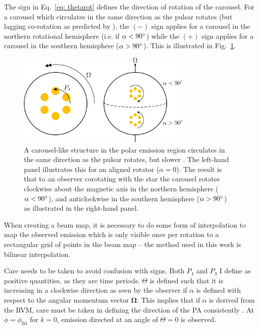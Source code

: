 The sign in Eq.~\eqref{eq: thetarot} defines the direction of rotation of the carousel. For a carousel which circulates in the same direction as the pulsar rotates (but lagging co-rotation as predicted by \citealt{RSxx1975}), the $(-)$ sign applies for a carousel in the northern rotational hemisphere (i.e. if $\alpha < 90^\circ$) while the $(+)$ sign applies for a carousel in the southern hemisphere ($\alpha > 90^\circ$). This is illustrated in Fig.~\ref{fig: geometry derivations - carousel direction}.
\begin{figure}
    \begin{center}
        \includegraphics[width=0.75\textwidth]{Figures/geometry_appendix/carousel_direction}
        \caption[Circulation direction of the carousel]{A carousel-like structure in the polar emission region circulates in the same direction as the pulsar rotates, but slower \citep{RSxx1975}. The left-hand panel illustrates this for an aligned rotator ($\alpha = 0$). The result is that to an observer corotating with the star the carousel rotates clockwise about the magnetic axis in the northern hemisphere ($\alpha < 90^\circ$), and anticlockwise in the southern hemisphere ($\alpha > 90^\circ$) as illustrated in the right-hand panel.}
        \label{fig: geometry derivations - carousel direction}
    \end{center}
\end{figure}
When creating a beam map, it is necessary to do some form of interpolation to map the observed emission which is only visible once per rotation to a rectangular grid of points in the beam map -- the method used in this work is bilinear interpolation.

Care needs to be taken to avoid confusion with signs. Both $P_4$ and $P_3$ I define as positive quantities, as they are time periods. $\Theta$ is defined such that it is increasing in a clockwise direction as seen by the observer if $\alpha$ is defined with respect to the angular momentum vector $\mathbf{\Omega}$. This implies that if $\alpha$ is derived from the RVM, care must be taken in defining the direction of the PA consistently \citep[see][]{EWxx2001}. At $\phi = \phi_\mathrm{fid}$ for $k = 0$, emission directed at an angle of $\Theta = 0$ is observed.

